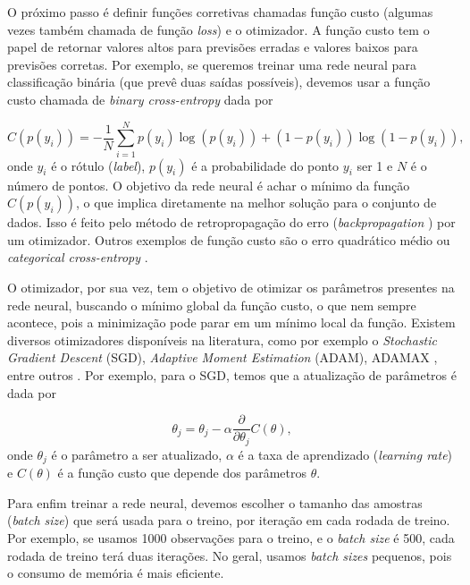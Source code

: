 \documentclass[a4paper,12pt,oneside]{book}
\begin{document}
\par O próximo passo é definir funções corretivas chamadas função custo (algumas vezes também chamada de função \textit{loss}) e o otimizador. A função custo tem o papel de retornar valores altos para previsões erradas e valores baixos para previsões corretas. Por exemplo, se queremos treinar uma rede neural para classificação binária (que prevê duas saídas possíveis), devemos usar a função custo chamada de \textit{binary cross-entropy} dada por \cite{dl_book}

\begin{equation}\label{eq:binary_cross_entropy}
    C(p(y_i)) = -\frac{1}{N}\sum_{i = 1} ^N p(y_i) \log(p(y_i)) + (1 - p(y_i))\log(1 - p(y_i)),
\end{equation}
%
onde $y_i$ é o rótulo (\textit{label}), $p(y_i)$ é a probabilidade do ponto $y_i$ ser 1 e $N$ é o número de pontos. O objetivo da rede neural é achar o mínimo da função $C(p(y_i))$, o que implica diretamente na melhor solução para o conjunto de dados. Isso é feito pelo método de retropropagação do erro (\textit{backpropagation} \cite{backpropagation}) por um otimizador. Outros exemplos de função custo são o erro quadrático médio ou \textit{categorical cross-entropy} \cite{MSE_CEF_review}.

\par O otimizador, por sua vez, tem o objetivo de otimizar os parâmetros presentes na rede neural, buscando o mínimo global da função custo, o que nem sempre acontece, pois a minimização pode parar em um mínimo local da função. Existem diversos otimizadores disponíveis na literatura, como por exemplo o \textit{Stochastic Gradient Descent} (SGD), \textit{Adaptive Moment Estimation} (ADAM), ADAMAX \cite{ADAMAX}, entre outros \cite{gradient_over}. Por exemplo, para o SGD, temos que a atualização de parâmetros é dada por

\begin{equation}\label{eq:SGD}
    \theta_j = \theta_{j} - \alpha \frac{\partial }{\partial \theta_j}C(\theta),
\end{equation}
%
onde $\theta_j$ é o parâmetro a ser atualizado, $\alpha$ é a taxa de aprendizado (\textit{learning rate}) e $C(\theta)$ é a função custo que depende dos parâmetros $\theta$.

\par Para enfim treinar a rede neural, devemos escolher o tamanho das amostras (\textit{batch size}) que será usada para o treino, por iteração em cada rodada de treino. Por exemplo, se usamos 1000 observações para o treino, e o \textit{batch size} é 500, cada rodada de treino terá duas iterações. No geral, usamos \textit{batch sizes} pequenos, pois o consumo de memória é mais eficiente.
\end{document}
